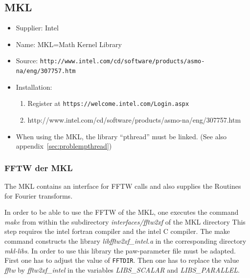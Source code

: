 \documentclass[a4paper,10pt]{report}
\newcommand{\mytt}[1]{{\tt #1}}
\begin{document}
\subsection{MKL}
\begin{itemize}
\item Supplier: Intel
\item Name: MKL=Math Kernel Library
\item Source: \mytt{http://www.intel.com/cd/software/products/asmo-na/eng/307757.htm}
\item Installation:
\begin{enumerate}
\item Register at \mytt{https://welcome.intel.com/Login.aspx}
\item http://www.intel.com/cd/software/products/asmo-na/eng/307757.htm
\end{enumerate}
\item When using the MKL, the library ``pthread'' must be linked. (See
also appendix~\ref{sec:problempthread})
\end{itemize}


\subsubsection{FFTW der MKL}
The MKL contains an interface for FFTW calls and also supplies the
Routines for Fourier transforms.

In order to be able to use the FFTW of the MKL, one executes the
command \textit{make} from within the subdirectory
\textit{interfaces/fftw2xf} of the MKL directory This step requires
the intel fortran compiler and the intel C compiler.  The make command
constructs the library \textit{libfftw2xf\_intel.a} in the
corresponding directory \textit{mkl-libs}. In order to use this
library the paw-parameter file must be adapted. First one has to
adjust the value of \mytt{FFTDIR}.  Then one has to replace the value
\textit{fftw} by \textit{fftw2xf\_intel} in the variables
\textit{LIBS\_SCALAR } and \textit{LIBS\_PARALLEL}.

\end{document}

